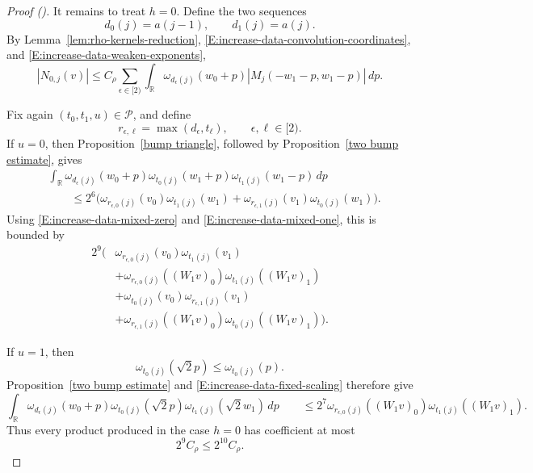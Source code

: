 \documentclass[12pt,reqno]{amsart}
\newcommand{\auto}{{({\tiny\faCar})}}
\theoremstyle{plain}
\numberwithin{equation}{section}
\theoremstyle{remark}
\begin{document}
\begin{proof}[Proof \auto]
It remains to treat \(h=0\). Define the two sequences
\[
d_0(j)=a(j-1),
\qquad
d_1(j)=a(j).
\]
By Lemma~\ref{lem:rho-kernels-reduction},
\eqref{E:increase-data-convolution-coordinates}, and
\eqref{E:increase-data-weaken-exponents},
\begin{equation}
    \label{E:increase-data-h-zero-initial}
    |N_{0,j}(v)| \leq C_\rho \sum_{\epsilon\in[2)} \int_{\mathbb R} \omega_{d_\epsilon(j)}(w_0+p) |M_j(-w_1-p,w_1-p)|\,dp.
\end{equation}

Fix again \((t_0,t_1,u)\in\mathcal P\), and define
\[
r_{\epsilon,\ell}
=
\max(d_\epsilon,t_\ell),
\qquad
\epsilon,\ell\in[2).
\]
If \(u=0\), then Proposition~\ref{bump triangle}, followed by
Proposition~\ref{two bump estimate}, gives
\[
\begin{aligned}
&
\int_{\mathbb R}
\omega_{d_\epsilon(j)}(w_0+p)
\omega_{t_0(j)}(w_1+p)
\omega_{t_1(j)}(w_1-p)\,dp
\\
&\qquad\leq
2^6\Big(
\omega_{r_{\epsilon,0}(j)}(v_0)
\omega_{t_1(j)}(w_1)
+
\omega_{r_{\epsilon,1}(j)}(v_1)
\omega_{t_0(j)}(w_1)
\Big).
\end{aligned}
\]
Using
\eqref{E:increase-data-mixed-zero} and
\eqref{E:increase-data-mixed-one}, this is bounded by
\begin{equation}
    \label{E:increase-data-h0-u0}
    \begin{aligned}
2^9\Big(
&
\omega_{r_{\epsilon,0}(j)}(v_0)
\omega_{t_1(j)}(v_1)
\\
&+
\omega_{r_{\epsilon,0}(j)}((W_1v)_0)
\omega_{t_1(j)}((W_1v)_1)
\\
&+
\omega_{t_0(j)}(v_0)
\omega_{r_{\epsilon,1}(j)}(v_1)
\\
&+
\omega_{r_{\epsilon,1}(j)}((W_1v)_0)
\omega_{t_0(j)}((W_1v)_1)
\Big).
\end{aligned}
\end{equation}

If \(u=1\), then
\[
\omega_{t_0(j)}(\sqrt2p)
\leq
\omega_{t_0(j)}(p).
\]
Proposition~\ref{two bump estimate} and
\eqref{E:increase-data-fixed-scaling} therefore give
\begin{equation}
    \label{E:increase-data-h0-u1}
    \int_{\mathbb R} \omega_{d_\epsilon(j)}(w_0+p) \omega_{t_0(j)}(\sqrt2p) \omega_{t_1(j)}(\sqrt2w_1)\,dp \qquad\leq 2^7 \omega_{r_{\epsilon,0}(j)}((W_1v)_0) \omega_{t_1(j)}((W_1v)_1).
\end{equation}
Thus every product produced in the case \(h=0\) has coefficient at
most
\[
2^9C_\rho
\leq
2^{10}C_\rho.
\]


\end{proof}
\end{document}
